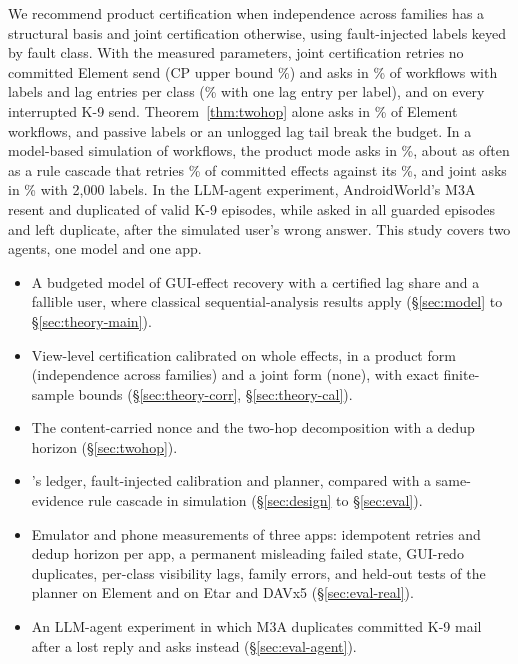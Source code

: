 We recommend product certification when independence across families has a structural basis and joint certification otherwise, using fault-injected labels keyed by fault class. With the measured parameters, joint certification retries no committed Element send (CP upper bound
\RsimFiveJointPvHi\%) and asks in \RsimFiveJointAsk\% of workflows with \RsimFiveLabelN{} labels and \CertLagBootN{} lag entries per class (\CertTiedFiveJointAsk\% with one lag entry per label), and on every interrupted K-9 send.
Theorem~\ref{thm:twohop} alone asks in \RsimElemGtwoAsk\% of Element workflows, and passive labels or an unlogged lag tail break the budget. In a model-based simulation of \SimN{} workflows,
the product mode asks in \SimGhostAsk\%, about as often as a rule cascade that retries \SimRulesPv\% of committed effects against its \SimGhostPv\%, and joint asks in \SimJointAsk\% with 2{,}000 labels.
In the LLM-agent experiment, AndroidWorld's M3A resent and duplicated \AgentDupN{} of \AgentValidN{} valid K-9 episodes, while \sys asked in all \AgentGuardAskN{} guarded episodes and left \AgentGuardDupN{} duplicate,
after the simulated user's wrong answer. This study covers two agents, one model and one app.

\begin{itemize}[leftmargin=*,topsep=2pt,itemsep=1pt]
\item A budgeted model of GUI-effect recovery with a certified lag share and a fallible user, where classical sequential-analysis results apply (\S\ref{sec:model} to \S\ref{sec:theory-main}).
\item View-level certification calibrated on whole effects, in a product form (independence across families) and a joint form (none), with exact finite-sample bounds (\S\ref{sec:theory-corr}, \S\ref{sec:theory-cal}).
\item The content-carried nonce and the two-hop decomposition with a dedup horizon (\S\ref{sec:twohop}).
\item \sys's ledger, fault-injected calibration and planner, compared with a same-evidence rule cascade in simulation (\S\ref{sec:design} to \S\ref{sec:eval}).
\item Emulator and phone measurements of three apps: idempotent retries and dedup horizon per app, a permanent misleading failed state, GUI-redo duplicates, per-class visibility lags, family errors,
  and held-out tests of the planner on Element and on Etar and DAVx5 (\S\ref{sec:eval-real}).
\item An LLM-agent experiment in which M3A duplicates committed K-9 mail after a lost reply and \sys asks instead (\S\ref{sec:eval-agent}).
\end{itemize}
